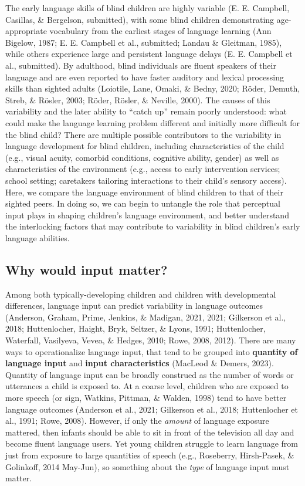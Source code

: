 \documentclass[
  man,floatsintext]{apa6}
\begin{document}
The early language skills of blind children are highly variable (E. E. Campbell, Casillas, \& Bergelson, submitted), with some blind children demonstrating age-appropriate vocabulary from the earliest stages of language learning (Ann Bigelow, 1987; E. E. Campbell et al., submitted; Landau \& Gleitman, 1985), while others experience large and persistent language delays (E. E. Campbell et al., submitted). By adulthood, blind individuals are fluent speakers of their language and are even reported to have faster auditory and lexical processing skills than sighted adults (Loiotile, Lane, Omaki, \& Bedny, 2020; Röder, Demuth, Streb, \& Rösler, 2003; Röder, Rösler, \& Neville, 2000). The causes of this variability and the later ability to ``catch up'' remain poorly understood: what could make the language learning problem different and initially more difficult for the blind child? There are multiple possible contributors to the variability in language development for blind children, including characteristics of the child (e.g., visual acuity, comorbid conditions, cognitive ability, gender) as well as characteristics of the environment (e.g., access to early intervention services; school setting; caretakers tailoring interactions to their child's sensory access). Here, we compare the language environment of blind children to that of their sighted peers. In doing so, we can begin to untangle the role that perceptual input plays in shaping children's language environment, and better understand the interlocking factors that may contribute to variability in blind children's early language abilities.

\hypertarget{why-would-input-matter}{%
\subsection{Why would input matter?}\label{why-would-input-matter}}

Among both typically-developing children and children with developmental differences, language input can predict variability in language outcomes (Anderson, Graham, Prime, Jenkins, \& Madigan, 2021, 2021; Gilkerson et al., 2018; Huttenlocher, Haight, Bryk, Seltzer, \& Lyons, 1991; Huttenlocher, Waterfall, Vasilyeva, Vevea, \& Hedges, 2010; Rowe, 2008, 2012). There are many ways to operationalize language input, that tend to be grouped into \textbf{quantity of language input} and \textbf{input characteristics} (MacLeod \& Demers, 2023). Quantity of language input can be broadly construed as the number of words or utterances a child is exposed to. At a coarse level, children who are exposed to more speech (or sign, Watkins, Pittman, \& Walden, 1998) tend to have better language outcomes (Anderson et al., 2021; Gilkerson et al., 2018; Huttenlocher et al., 1991; Rowe, 2008). However, if only the \emph{amount} of language exposure mattered, then infants should be able to sit in front of the television all day and become fluent language users. Yet young children struggle to learn language from just from exposure to large quantities of speech (e.g., Roseberry, Hirsh-Pasek, \& Golinkoff, 2014 May-Jun), so something about the \emph{type} of language input must matter.
\end{document}
